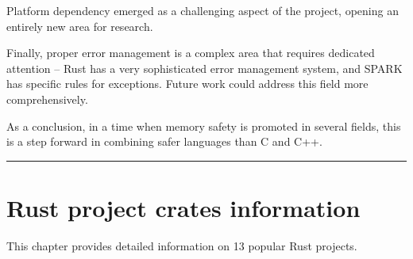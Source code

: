 \documentclass[nomenclature, english, bibtex]{kththesis}
\newcommand*{\engExpl}[1]{\todo[inline, backgroundcolor=kth-lightgreen40]{#1}} %
\newcommand*{\sweExpl}[1]{\todo[inline, backgroundcolor=kth-lightblue40]{#1}}  %
\newcommand*{\warningExpl}[1]{\todo[inline, backgroundcolor=kth-lightred40]{#1}} %
\begin{document}
{Platform dependency emerged as a challenging aspect of the project, opening an entirely new area for research. 

Finally, proper error management is a complex area that requires dedicated attention -- Rust has a very sophisticated error management system, and SPARK has specific rules for exceptions. Future work could address this field more comprehensively.

As a conclusion, in a time when memory safety is promoted in several fields, this is a step forward in combining safer languages than C and C++.



\noindent\rule{\textwidth}{0.4mm}

\cleardoublepage
\renewcommand{\bibname}{References}

\ifbiblatex
    \printbibliography[heading=bibintoc]
\else
    
\fi



\cleardoublepage
\appendix
\renewcommand{\chaptermark}[1]{\markboth{Appendix \thechapter\relax:\thinspace\relax#1}{}}

\chapter{Rust project crates information}
\label{ch:cratesinfo}

This chapter provides detailed information on 13 popular Rust projects.

}
\end{document}
